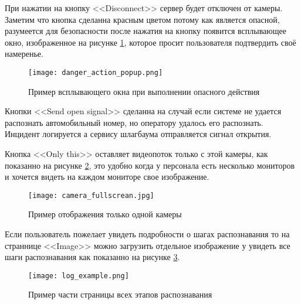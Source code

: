 При нажатии на кнопку <<Disconnect>> сервер будет отключен от камеры. Заметим что кнопка сделанна красным цветом потому как является опасной, разумеется для безопасности после нажатия на кнопку появится всплывающее окно, изображенное на рисунке \ref{sec:user_guide:danger_action_popup}, которое просит пользователя подтвердить своё намеренье. 

\begin{figure}[ht]
  \centering
  \texttt{[image: danger\_action\_popup.png]} 
  \caption{Пример всплывающего окна при выполнении опасного действия} 
  \label{sec:user_guide:danger_action_popup}
\end{figure}

Кнопки <<Send open signal>> сделанна на случай если системе не удается распознать автомобильный номер, но оператору удалось его распознать. Инцидент логируется а сервису шлагбаума отправляется сигнал открытия.

Кнопка <<Only this>> оставляет видеопоток только с этой камеры, как показанно на рисунке \ref{sec:user_guide:only_one_fullscrean}, это удобно когда у персонала есть несколько мониторов и хочется видеть на каждом мониторе свое изображение.

\begin{figure}[ht]
  \centering
  \texttt{[image: camera\_fullscrean.jpg]} 
  \caption{Пример отображения только одной камеры} 
  \label{sec:user_guide:only_one_fullscrean}
\end{figure}

Если пользователь пожелает увидеть подробности о шагах распознавания то на страннице <<Image>> можно загрузить отдельное изображение у увидеть все шаги распознавания как показанно на рисунке \ref{sec:user_guide:log_example}. 

\begin{figure}[ht]
  \centering
  \texttt{[image: log\_example.png]} 
  \caption{Пример части страницы всех этапов распознавания} 
  \label{sec:user_guide:log_example}
\end{figure}